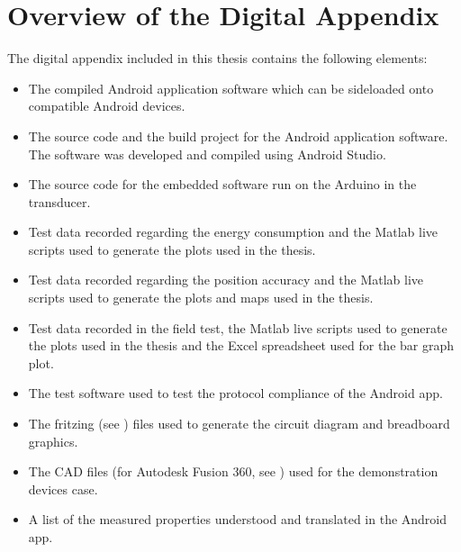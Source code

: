 \chapter{Overview of the Digital Appendix}
The digital appendix included in this thesis contains the following elements:

\begin{itemize}
\item The compiled Android application software which can be sideloaded onto compatible Android devices.
\item The source code and the build project for the Android application software. The software was developed and compiled using Android Studio.
\item The source code for the embedded software run on the Arduino in the transducer.
\item Test data recorded regarding the energy consumption and the Matlab live scripts used to generate the plots used in the thesis.
\item Test data recorded regarding the position accuracy and the Matlab live scripts used to generate the plots and maps used in the thesis.
\item Test data recorded in the field test, the Matlab live scripts used to generate the plots used in the thesis and the Excel spreadsheet used for the bar graph plot.
\item The test software used to test the protocol compliance of the Android app.
\item The fritzing (see \cite{fritzing}) files used to generate the circuit diagram and breadboard graphics.
\item The CAD files (for Autodesk Fusion 360, see \cite{f360}) used for the demonstration devices case.
\item A list of the measured properties understood and translated in the Android app.
\end{itemize}